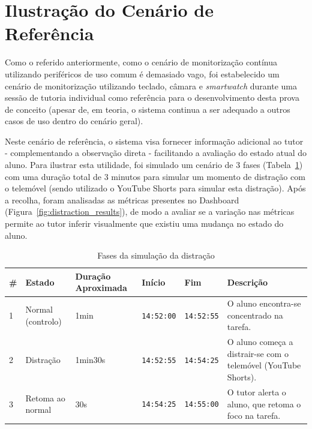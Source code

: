 
\section{Ilustração do Cenário de Referência}

Como o referido anteriormente, como o cenário de monitorização contínua utilizando periféricos de uso comum é demasiado vago, foi estabelecido um cenário de monitorização utilizando teclado, câmara e \textit{smartwatch} durante uma sessão de tutoria individual como referência para o desenvolvimento desta prova de conceito (apesar de, em teoria, o sistema continua a ser adequado a outros casos de uso dentro do cenário geral).

Neste cenário de referência, o sistema visa fornecer informação adicional ao tutor - complementando a observação direta - facilitando a avaliação do estado atual do aluno.
Para ilustrar esta utilidade, foi simulado um cenário de 3 fases (Tabela~\ref{tab:distraction_phases}) com uma duração total de 3 minutos para simular um momento de distração com o telemóvel (sendo utilizado o YouTube Shorts para simular esta distração).
Após a recolha, foram analisadas as métricas presentes no Dashboard (Figura~\ref{fig:distraction_results}), de modo a avaliar se a variação nas métricas permite ao tutor inferir visualmente que existiu uma mudança no estado do aluno.

\begin{table}[h]
    \centering
    \setlength{\tabcolsep}{4pt}
    \begin{tabularx}{\linewidth}{l X p{2cm} l l X}
        \toprule
        \textbf{\#} & \textbf{Estado} & \textbf{Duração \newline Aproximada} & \textbf{Início} & \textbf{Fim} & \textbf{Descrição} \\
        \midrule
        1 & Normal (controlo) & 1min & \texttt{14:52:00} & \texttt{14:52:55} & O aluno encontra-se concentrado na tarefa. \\
        2 & Distração & 1min30s & \texttt{14:52:55} & \texttt{14:54:25} & O aluno começa a distrair-se com o telemóvel (YouTube Shorts). \\
        3 & Retoma ao normal & 30s & \texttt{14:54:25} & \texttt{14:55:00} & O tutor alerta o aluno, que retoma o foco na tarefa. \\
        \bottomrule
    \end{tabularx}
    \caption{Fases da simulação da distração}
    \label{tab:distraction_phases}
\end{table}

